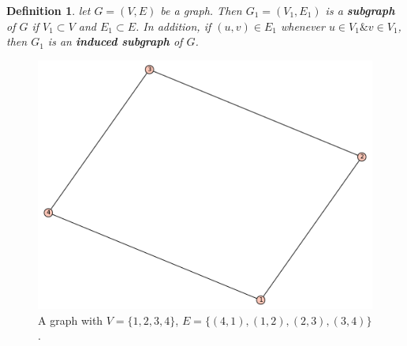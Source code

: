 \documentclass[12pt, leqno]{article}
\newtheorem{defn}[thm]{Definition}
\begin{document}
\begin{defn} let $G = (V,E)$ be a graph. Then $G_1
= (V_1,E_1)$ is a \textbf{subgraph} of $G$ if $V_1 \subset V$ and $E_1 \subset
E$. In addition, if $(u,v) \in E_1$ whenever $u \in V_1 \& v \in V_1$,
then $G_1$ is an \textbf{induced subgraph} of $G$. 
\end{defn}
\begin{figure}
\begin{center}
  \includegraphics [scale=0.4]{h03.pdf}
\end{center}
  \caption{A graph with $V = \{1,2,3,4\}$, $E =
    \{(4,1),(1,2),(2,3),(3,4)\}$.}
\label{4cycle}
\end{figure}
\end{document}
